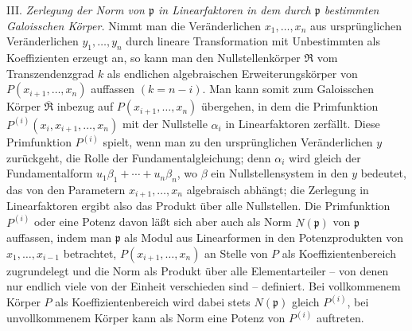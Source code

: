 III. \emph{Zerlegung der Norm von $\mathfrak p$ in Linearfaktoren in dem durch $\mathfrak p$ bestimmten Galoisschen Körper.} Nimmt man die Veränderlichen $x_1,\ldots,x_n$ aus ursprünglichen Veränderlichen $y_1,\ldots,y_n$ durch lineare Transformation mit Unbestimmten als Koeffizienten erzeugt an, so kann man den Nullstellenkörper $\mathfrak R$ vom Transzendenzgrad $k$ als endlichen algebraischen Erweiterungskörper von $P(x_{i+1},\ldots,x_n)$ auffassen $(k=n-i)$. Man kann somit zum Galoisschen Körper $\overline{\mathfrak R}$ inbezug auf $P(x_{i+1},\ldots,x_n)$ übergehen, in dem die Primfunktion $P^{(i)}(x_i,x_{i+1},\ldots,x_n)$ mit der Nullstelle $\alpha_i$ in Linearfaktoren zerfällt. Diese Primfunktion $P^{(i)}$ spielt, wenn man zu den ursprünglichen Veränderlichen $y$ zurückgeht, die Rolle der Fundamentalgleichung; denn $\alpha_i$ wird gleich der Fundamentalform $u_1\beta_1+\cdots+u_n\beta_n$, wo $\beta$ ein Nullstellensystem in den $y$ bedeutet, das von den Parametern $x_{i+1},\ldots,x_n$ algebraisch abhängt; die Zerlegung in Linearfaktoren ergibt also das Produkt über alle Nullstellen. Die Primfunktion $P^{(i)}$ oder eine Potenz davon läßt sich aber auch als Norm $N(\mathfrak p)$ von $\mathfrak p$ auffassen, indem man $\mathfrak p$ als Modul aus Linearformen in den Potenzprodukten von $x_1,\ldots,x_{i-1}$ betrachtet, $P(x_{i+1},\ldots,x_n)$ an Stelle von $P$ als Koeffizientenbereich zugrundelegt und die Norm als Produkt über alle Elementarteiler -- von denen nur endlich viele von der Einheit verschieden sind -- definiert. Bei vollkommenem Körper $P$ als Koeffizientenbereich wird dabei stets $N(\mathfrak p)$ gleich $P^{(i)}$, bei unvollkommenem Körper kann als Norm eine Potenz von $P^{(i)}$ auftreten.

